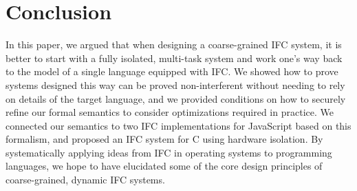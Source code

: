 \section{Conclusion}
\label{sec:conclusion}

In this paper, we argued that when designing a coarse-grained IFC
system, it is better to start with a fully isolated, multi-task system
and work one's way back to the model of a single language equipped
with IFC.  We showed
how to prove systems designed this way can be proved non-interferent
without needing to rely on details of the target language, and
we provided conditions on how to securely refine our formal semantics to
consider optimizations required in practice.  We connected our semantics
to two IFC implementations for JavaScript based on this formalism,
and proposed
an IFC system for C using hardware isolation.
By systematically applying ideas from IFC in operating systems to programming languages,
we hope to have elucidated some of the core design principles of coarse-grained,
dynamic IFC systems.


